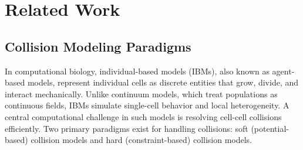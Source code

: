 \documentclass[a4paper,fleqn]{cas-dc}
\begin{document}
\section{Related Work}

\subsection{Collision Modeling Paradigms}

In computational biology, individual-based models (IBMs), also known as agent-based models, represent individual cells as discrete entities that grow, divide, and interact mechanically. Unlike continuum models, which treat populations as continuous fields, IBMs simulate single-cell behavior and local heterogeneity. A central computational challenge in such models is resolving cell-cell collisions efficiently. Two primary paradigms exist for handling collisions: soft (potential-based) collision models and hard (constraint-based) collision models.
\end{document}
